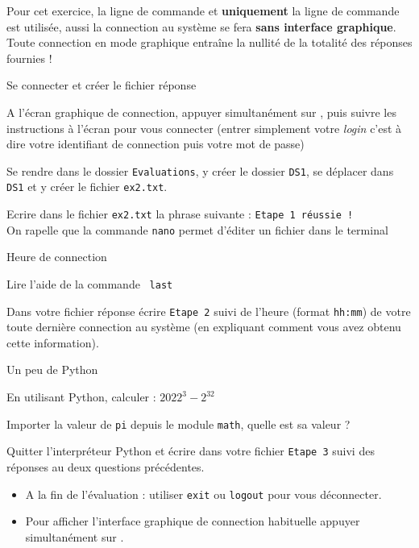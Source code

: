 \documentclass[11pt,a4paper]{article}
\begin{document}
\begin{tcolorbox}[title=\textcolor{black}{\danger \; Attention !},colbacktitle=lightgray]
     Pour cet exercice, la ligne de commande et \textbf{uniquement} la ligne de commande est utilisée, aussi la connection au système se fera \textbf{sans interface graphique}. Toute connection en mode graphique entraîne la nullité de la totalité des réponses fournies !
\end{tcolorbox}
\QListe
    \item Se connecter et créer le fichier réponse
\SQListe
\item A l'écran graphique de connection, appuyer simultanément sur , puis suivre les instructions à l'écran pour vous connecter (entrer simplement votre \textit{login} c'est à dire votre identifiant de connection puis votre mot de passe)
\item Se rendre dans le dossier {\tt Evaluations}, y créer le dossier {\tt DS1}, se déplacer dans {\tt DS1} et y créer le fichier {\tt ex2.txt}.
\item Ecrire dans le fichier {\tt ex2.txt} la phrase suivante : {\tt Etape 1 réussie !} \\
    \aide \; On rapelle que la commande {\tt nano} permet d'éditer un fichier dans le terminal
\FinListe
    \item Heure de connection
\SQListe
\item Lire l'aide de la commande  {\tt last}
\item Dans votre fichier réponse écrire {\tt Etape 2} suivi de l'heure (format {\tt hh:mm}) de votre toute dernière connection au système (en expliquant comment vous avez obtenu cette information).
\FinListe
\item Un peu de Python
\SQListe
    \item En utilisant Python, calculer : $ 2022^{3}-2^{32}$
    \item Importer la valeur de {\tt pi} depuis le module {\tt math}, quelle est sa valeur ?
    \item Quitter l'interpréteur Python et écrire dans votre fichier {\tt Etape 3} suivi des réponses au deux questions précédentes.
\FinListe

\FinListe
\begin{tcolorbox}[title=\textcolor{black}{\faHandPointRight \; Remarques},colbacktitle=lightgray]
    \begin{itemize}
        \item A la fin de l'évaluation : utiliser {\tt exit} ou {\tt logout} pour vous déconnecter.
        \item Pour afficher l'interface graphique de connection habituelle appuyer simultanément sur .
    \end{itemize}
\end{tcolorbox}
\end{document}
